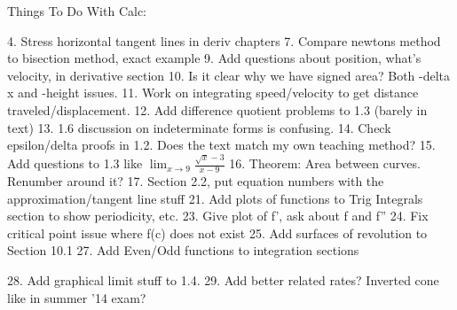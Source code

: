 Things To Do With Calc:

4. Stress horizontal tangent lines in deriv chapters
7. Compare newtons method to bisection method, exact example
9. Add questions about position, what's velocity, in derivative section
10. Is it clear why we have signed area? Both -delta x and -height issues.
11. Work on integrating speed/velocity to get distance traveled/displacement.
12. Add difference quotient problems to 1.3 (barely in text)
13. 1.6 discussion on indeterminate forms is confusing.
14. Check epsilon/delta proofs in 1.2. Does the text match my own teaching method?
15. Add questions to 1.3 like $\lim_{x\to9}\frac{\sqrt{x}-3}{x-9}$
16. Theorem: Area between curves. Renumber around it?
17. Section 2.2, put equation numbers with the approximation/tangent line stuff
21. Add plots of functions to Trig Integrals section to show periodicity, etc.
23. Give plot of f', ask about f and f''
24. Fix critical point issue where f(c) does not exist
25. Add surfaces of revolution to Section 10.1
27. Add Even/Odd functions to integration sections

28. Add graphical limit stuff to 1.4.
29. Add better related rates? Inverted cone like in summer '14 exam?

